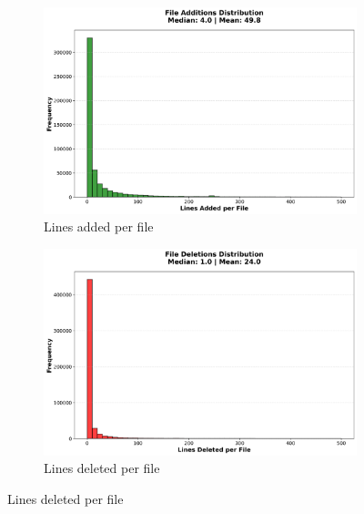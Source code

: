\documentclass[11pt]{article}
\begin{document}
\begin{figure}[H]
\centering
\begin{subfigure}[b]{0.48\textwidth}
\centering
\includegraphics[width=\textwidth]{figures_individual/25_file_additions_histogram.png}
\caption{Lines added per file}
\label{fig:file_adds}
\end{subfigure}
\hfill
\begin{subfigure}[b]{0.48\textwidth}
\centering
\includegraphics[width=\textwidth]{figures_individual/26_file_deletions_histogram.png}
\caption{Lines deleted per file}
\label{fig:file_dels}
\end{subfigure}

\vspace{0.2cm}


\end{figure}
\end{document}
